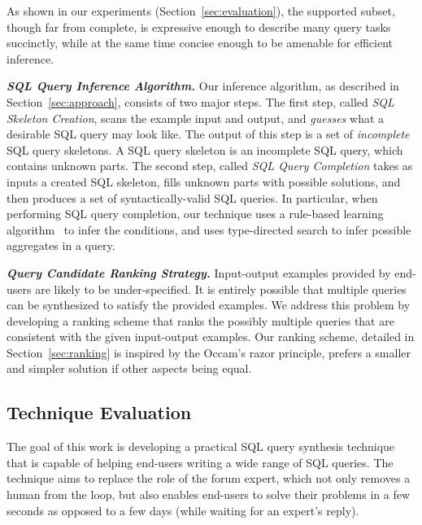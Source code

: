 As shown in our experiments (Section~\ref{sec:evaluation}), the supported subset, though far from complete, is expressive
enough to describe many query tasks succinctly, while at the same time concise
enough to be amenable for efficient inference. 



\vspace{1mm}
\noindent \textbf{\textit{SQL Query Inference Algorithm.}} Our inference
algorithm, as described in Section~\ref{sec:approach}, consists of two
major steps. The first step, called \textit{SQL Skeleton Creation}, scans
the example input and output, and \textit{guesses} what a desirable
SQL query may look like. The output of this step is a set of \textit{incomplete} SQL
query skeletons. A SQL query skeleton is an incomplete SQL query,
which contains unknown parts. The second step,
called \textit{SQL Query Completion} takes as inputs a created
SQL skeleton, fills unknown parts with possible solutions, and then produces a set of
syntactically-valid SQL queries. In particular, when performing
SQL query completion, our technique uses a rule-based learning algorithm~\cite{}
to infer the conditions, and uses 
type-directed search to infer possible aggregates in a query.

\vspace{1mm}
\noindent \textbf{\textit{Query Candidate Ranking Strategy.}}
Input-output examples provided by end-users are likely to
be under-specified. It is entirely possible that multiple
queries can be synthesized to satisfy the provided examples.
We address this problem by developing a ranking scheme that 
ranks the possibly multiple queries
that are consistent with the given input-output
examples. Our ranking scheme, detailed in Section~\ref{sec:ranking}
is inspired by the Occam's razor principle, prefers a smaller and
simpler solution if other aspects being equal.




\subsection{Technique Evaluation}

The goal of this work is developing a practical SQL query synthesis technique that is capable of
helping end-users writing a wide range of SQL queries.
The technique aims to replace the role of the forum expert,
which not only removes a human from the loop, but also enables
end-users to solve their problems in a few seconds as opposed to a few days
(while waiting for an expert's reply). 


